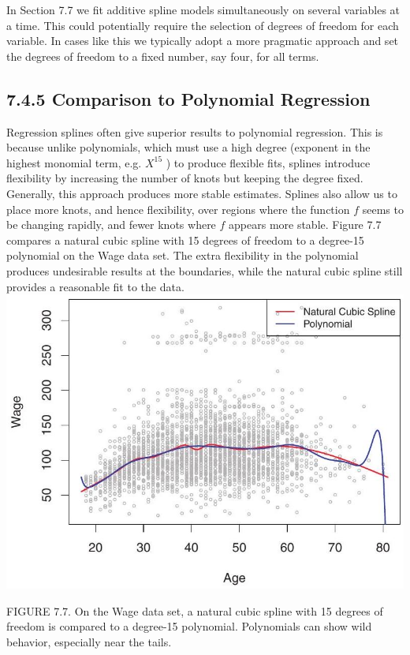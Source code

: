 \documentclass[10pt]{article}
\begin{document}
In Section 7.7 we fit additive spline models simultaneously on several variables at a time. This could potentially require the selection of degrees of freedom for each variable. In cases like this we typically adopt a more pragmatic approach and set the degrees of freedom to a fixed number, say four, for all terms.

\subsection*{7.4.5 Comparison to Polynomial Regression}
Regression splines often give superior results to polynomial regression. This is because unlike polynomials, which must use a high degree (exponent in the highest monomial term, e.g. $X^{15}$ ) to produce flexible fits, splines introduce flexibility by increasing the number of knots but keeping the degree fixed. Generally, this approach produces more stable estimates. Splines also allow us to place more knots, and hence flexibility, over regions where the function $f$ seems to be changing rapidly, and fewer knots where $f$ appears more stable. Figure 7.7 compares a natural cubic spline with 15 degrees of freedom to a degree-15 polynomial on the Wage data set. The extra flexibility in the polynomial produces undesirable results at the boundaries, while the natural cubic spline still provides a reasonable fit to the data.\\
\includegraphics[max width=\textwidth, center]{2025_05_05_efe77898333945044de4g-292}

FIGURE 7.7. On the Wage data set, a natural cubic spline with 15 degrees of freedom is compared to a degree-15 polynomial. Polynomials can show wild behavior, especially near the tails.
\end{document}
